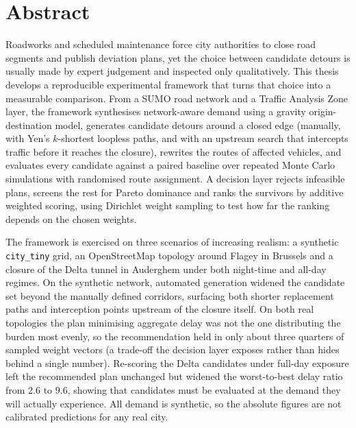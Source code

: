 \section*{Abstract}

Roadworks and scheduled maintenance force city authorities to close road
segments and publish deviation plans, yet the choice between candidate detours
is usually made by expert judgement and inspected only qualitatively. This
thesis develops a reproducible experimental framework that turns that choice
into a measurable comparison. From a SUMO road network and a Traffic Analysis
Zone layer, the framework synthesises network-aware demand using a gravity
origin-destination model, generates candidate detours around a closed edge
(manually, with Yen's $k$-shortest loopless paths, and with an upstream search
that intercepts traffic before it reaches the closure), rewrites the routes of
affected vehicles, and evaluates every candidate against a paired baseline over
repeated Monte Carlo simulations with randomised route assignment. A decision
layer rejects infeasible plans, screens the rest for Pareto dominance and ranks
the survivors by additive weighted scoring, using Dirichlet weight sampling to
test how far the ranking depends on the chosen weights.

The framework is exercised on three scenarios of increasing realism: a synthetic
\texttt{city\_tiny} grid, an OpenStreetMap topology around Flagey in Brussels and a closure of the Delta tunnel in Auderghem under both night-time and all-day
regimes. On the synthetic network, automated generation widened the candidate
set beyond the manually defined corridors, surfacing both shorter replacement
paths and interception points upstream of the closure itself. On both
real topologies the plan minimising aggregate delay was not the one distributing
the burden most evenly, so the recommendation held in only about three quarters
of sampled weight vectors (a trade-off the decision layer exposes rather than
hides behind a single number). Re-scoring the Delta candidates under full-day
exposure left the recommended plan unchanged but widened the worst-to-best delay
ratio from $2.6$ to $9.6$, showing that candidates must be evaluated at the
demand they will actually experience. All demand is synthetic, so the absolute
figures are not calibrated predictions for any real city.
